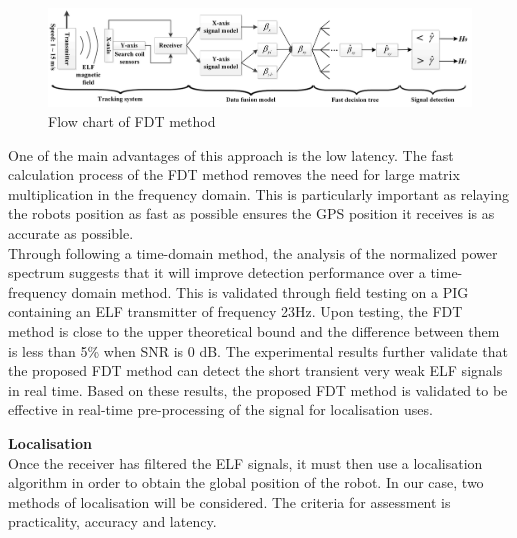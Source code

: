 \documentclass[11pt]{article}		%
\begin{document}
	         \begin{figure}[h]
				\centering
				\includegraphics[scale=0.12]{FDT.png}
				\caption{Flow chart of FDT method } %
				\label{FDTFlowcahrt}
			\end{figure}
			
			One of the main advantages of this approach is the low latency. 
			The fast calculation process of the FDT method removes the need for large matrix multiplication in the frequency domain. 
			This is particularly important as relaying the robots position as fast as possible ensures the GPS position it receives is as accurate as possible. 
			\\
	    	\hspace*{3ex}Through following a time-domain method, the analysis of the normalized power spectrum suggests that it will improve detection performance over a time-frequency domain method. 
	    	This is validated through field testing on a PIG containing an ELF transmitter of frequency 23Hz. 
	    	Upon testing, the FDT method is close to the upper theoretical bound and the difference between them is less than 5\%  when SNR is 0 dB.
	    	The experimental results further validate that the proposed FDT method can detect the short transient very weak ELF signals in real time. 
	    	Based on these results, the proposed FDT method is validated to be effective in real-time pre-processing of the signal for localisation uses.
			
			\textbf{Localisation}\\
			Once the receiver has filtered the ELF signals, it must then use a localisation algorithm in order to obtain the global position of the robot. In our case, two methods of localisation will be considered. The criteria for assessment is practicality, accuracy and latency. 
			
\end{document}
